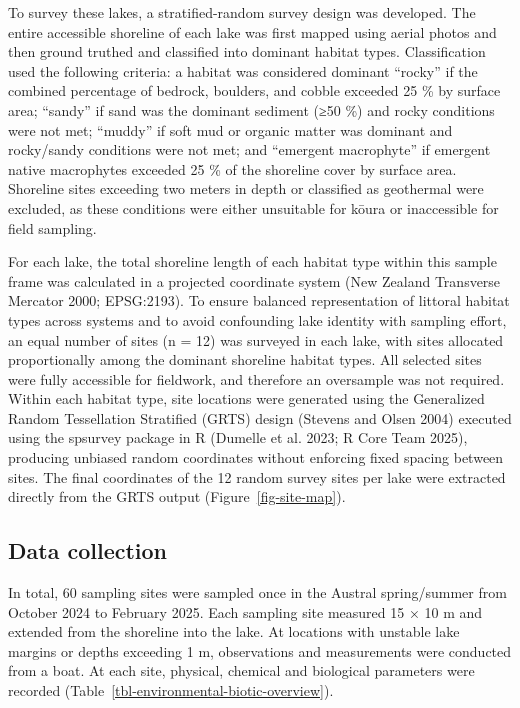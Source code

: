 \documentclass[
  12pt,
  a4paper,
  oneside]{scrbook}
\begin{document}
To survey these lakes, a stratified-random survey design was developed.
The entire accessible shoreline of each lake was first mapped using
aerial photos and then ground truthed and classified into dominant
habitat types. Classification used the following criteria: a habitat was
considered dominant ``rocky'' if the combined percentage of bedrock,
boulders, and cobble exceeded 25 \% by surface area; ``sandy'' if sand
was the dominant sediment (≥50 \%) and rocky conditions were not met;
``muddy'' if soft mud or organic matter was dominant and rocky/sandy
conditions were not met; and ``emergent macrophyte'' if emergent native
macrophytes exceeded 25 \% of the shoreline cover by surface area.
Shoreline sites exceeding two meters in depth or classified as
geothermal were excluded, as these conditions were either unsuitable for
kōura or inaccessible for field sampling.

For each lake, the total shoreline length of each habitat type within
this sample frame was calculated in a projected coordinate system (New
Zealand Transverse Mercator 2000; EPSG:2193). To ensure balanced
representation of littoral habitat types across systems and to avoid
confounding lake identity with sampling effort, an equal number of sites
(n = 12) was surveyed in each lake, with sites allocated proportionally
among the dominant shoreline habitat types. All selected sites were
fully accessible for fieldwork, and therefore an oversample was not
required. Within each habitat type, site locations were generated using
the Generalized Random Tessellation Stratified (GRTS) design (Stevens
and Olsen 2004) executed using the spsurvey package in R (Dumelle et al.
2023; R Core Team 2025), producing unbiased random coordinates without
enforcing fixed spacing between sites. The final coordinates of the 12
random survey sites per lake were extracted directly from the GRTS
output (Figure~\ref{fig-site-map}).

\subsection{Data collection}\label{data-collection}

In total, 60 sampling sites were sampled once in the Austral
spring/summer from October 2024 to February 2025. Each sampling site
measured 15 × 10 m and extended from the shoreline into the lake. At
locations with unstable lake margins or depths exceeding 1 m,
observations and measurements were conducted from a boat. At each site,
physical, chemical and biological parameters were recorded
(Table~\ref{tbl-environmental-biotic-overview}).
\end{document}
